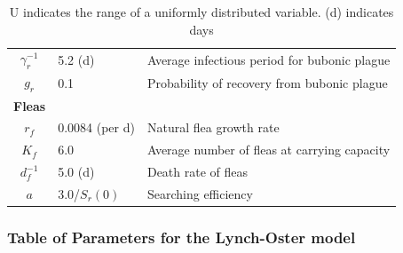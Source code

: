 \documentclass [letterpaper, 12pt] {article}
\begin{document}
\begin{table}[H]
{\begin{tabular}{|c|l|l|}
$\gamma_r^{-1}$ & 5.2 (d) & Average infectious period for bubonic plague \\
$g_r$ & 0.1 & Probability of recovery from bubonic plague \\ \hline
\multicolumn{1}{|l|}{\textbf{Fleas}} &  &  \\
$r_f$ & 0.0084 (per d) & Natural flea growth rate \\
$K_f$ & 6.0 & Average number of fleas at carrying capacity \\
$d_f^{-1}$ & 5.0 (d) & Death rate of fleas \\
$a$ & 3.0/$S_r(0)$ & Searching efficiency \\ \hline
\end{tabular}%
}
\caption{U indicates the range of a uniformly distributed variable. (d) indicates days}
\end{table}


\subsubsection{Table of Parameters for the Lynch-Oster model}
\end{document}
